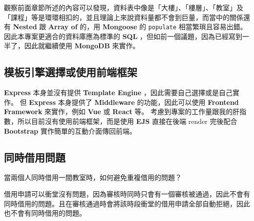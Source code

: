 \documentclass{article}
\begin{document}
觀察前面章節所述的內容可以發現，資料表中像是「大樓」、「樓層」、「教室」及「課程」等是環環相扣的，並且理論上來說資料量都不會到巨量，而當中的關係還有 \textbf{Nested} 跟 \textbf{Array of} 的，用 \textbf{Mongoose} 的 \verb|populate| 相當繁瑣且容易出錯。
因此本專案更適合的資料庫應為標準的 \textbf{SQL} ，但如前一個議題，因為已經寫到一半了，因此就繼續使用 \textbf{MongoDB} 來實作。

\subsection{模板引擎選擇或使用前端框架}

\textbf{Express} 本身並沒有提供 \textbf{Template Engine} ，因此需要自己選擇或是自己實作。
但 \textbf{Express} 本身提供了 \textbf{Middleware} 的功能，因此可以使用 \textbf{Frontend Framework} 來實作，例如 \textbf{Vue} 或 \textbf{React} 等。
考慮到專案的工作量跟我的肝指數，所以目前沒有使用前端框架，而是使用 \textbf{EJS} 直接在後端 render 完後配合 \textbf{Bootstrap} 實作簡單的互動介面傳回前端。

\subsection{同時借用問題}

當兩個人同時借用一間教室時，如何避免重複借用的問題？

借用申請可以衝堂沒有問題，因為審核時同時只會有一個審核被通過，因此不會有同時借用的問題。且在審核通過時會將該時段衝堂的借用申請全部自動拒絕，因此也不會有同時借用的問題。
\end{document}
